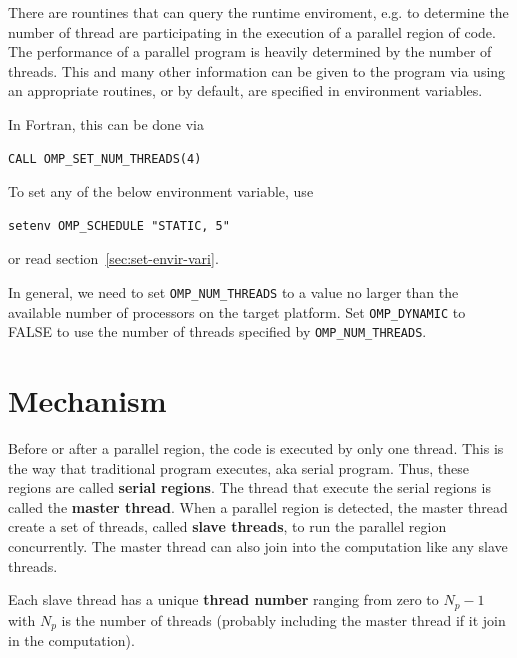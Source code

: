 There are rountines that can query the runtime enviroment, e.g. to
determine the number of thread are participating in the execution of a
parallel region of code. 
The performance of a parallel program is heavily determined by the
number of threads. This and many other information can be given to the
program via using an appropriate routines, or by default, are
specified in environment variables.

In Fortran, this can be done via
\begin{lstlisting}
CALL OMP_SET_NUM_THREADS(4)
\end{lstlisting}
To set any of the below environment variable, use
\begin{verbatim}
setenv OMP_SCHEDULE "STATIC, 5"
\end{verbatim}
or read section~\ref{sec:set-envir-vari}.

In general, we need to set \verb!OMP_NUM_THREADS! to a value no larger
than the available number of processors on the target platform. Set
\verb!OMP_DYNAMIC!  to FALSE to use the number of threads specified by
\verb!OMP_NUM_THREADS!.
 

\section{Mechanism}
\label{sec:mechanism}

Before or after a parallel region, the code is executed by only one
thread. This is the way that traditional program executes, aka serial
program. Thus, these regions are called {\bf serial regions}. The
thread that execute the serial regions is called the
{\bf master thread}. When a parallel region is detected, the master
thread create a set of threads, called {\bf slave threads}, to run the
parallel region concurrently. The master thread can also join into the
computation like any slave threads. 

Each slave thread has a unique {\bf thread number} ranging from zero
to $N_p-1$ with $N_p$ is the number of threads (probably including the
master thread if it join in the computation).

